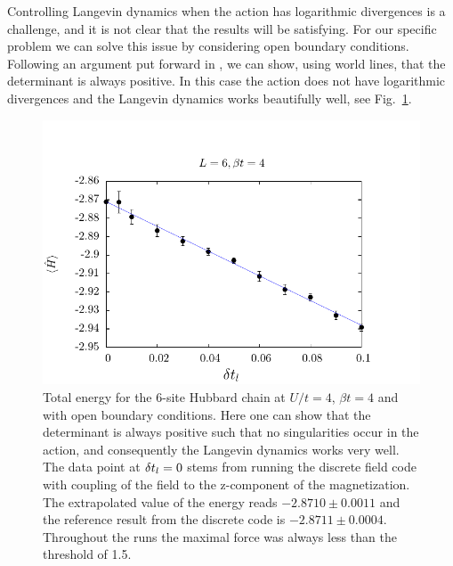 Controlling Langevin dynamics when the action has logarithmic divergences is a challenge, and it is not clear  that the results will be satisfying.  For our specific problem we can solve this issue by considering open boundary conditions. Following an argument put forward in \cite{Assaad07}, we can show, using world lines, that the determinant is always positive.   In this case the  action does not  have logarithmic divergences and the Langevin dynamics works beautifully well, see Fig.~\ref{Langevin.fig}. 

\begin{figure}[H]
        \begin{center}
                \includegraphics[scale=0.9]{Figures/Langevin.pdf}
            \end{center}
        \caption{\label{Langevin.fig}   Total energy for the 6-site Hubbard chain at $U/t=4$, $\beta t = 4$ and with open boundary conditions.   Here one can show that the determinant is always positive such that  no   singularities occur in the action, and consequently the Langevin dynamics works very well.  The data point at $\delta t_{l} =0$ stems from running the  discrete  field code with coupling  of the field to the z-component of the magnetization.  The extrapolated value of the energy reads
        $-2.8710   \pm 0.0011$
        and the reference result from the discrete code is
        $-2.8711   \pm  0.0004 $.
        Throughout the runs the maximal force was always less than the threshold of 1.5.   }
\end{figure}

